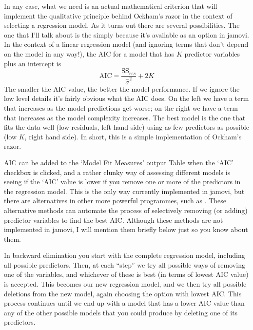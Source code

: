 In any case, what we need is an actual mathematical criterion that will implement the qualitative principle behind Ockham's razor in the context of selecting a regression model. As it turns out there are several possibilities. The one that I'll talk about is the  \parencite[AIC; ][]{Akaike1974} simply because it's available as an option in jamovi. In the context of a linear regression model (and ignoring terms that don't depend on the model in any way!), the AIC for a model that has $K$ predictor variables plus an intercept is
$$
\mbox{AIC} = \displaystyle\frac{\mbox{SS}_{res}}{\hat{\sigma}^2} + 2K
$$
The smaller the AIC value, the better the model performance. If we ignore the low level details it's fairly obvious what the AIC does. On the left we have a term that increases as the model predictions get worse; on the right we have a term that increases as the model complexity increases. The best model is the one that fits the data well (low residuals, left hand side) using as few predictors as possible (low $K$, right hand side). In short, this is a simple implementation of Ockham's razor. 

AIC can be added to the `Model Fit Measures' output Table when the `AIC' checkbox is clicked, and a rather clunky way of assessing different models is seeing if the `AIC' value is lower if you remove one or more of the predictors in the regression model. This is the only way currently implemented in jamovi, but there are alternatives in other more powerful programmes, such as \R. These alternative methods can automate the process of selectively removing (or adding) predictor variables to find the best AIC. Although these methods are not implemented in jamovi, I will mention them briefly below just so you know about them.


In backward elimination you start with the complete regression model, including all possible predictors. Then, at each ``step'' we try all possible ways of removing one of the variables, and whichever of these is best (in terms of lowest AIC value) is accepted. This becomes our new regression model, and we then try all possible deletions from the new model, again choosing the option with lowest AIC. This process continues until we end up with a model that has a lower AIC value than any of the other possible models that you could produce by deleting one of its predictors. 

